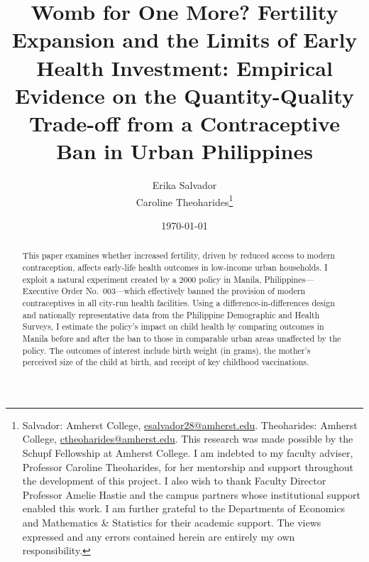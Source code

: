 \documentclass[]{AEA}
\begin{document}
\title{Womb for One More? Fertility Expansion and the Limits of Early
Health Investment: Empirical Evidence on the Quantity-Quality Trade-off
from a Contraceptive Ban in Urban Philippines}


\author{
  Erika Salvador\\
  Caroline Theoharides\thanks{
  Salvador: Amherst
College, \href{mailto:esalvador28@amherst.edu}{esalvador28@amherst.edu}.
  Theoharides: Amherst
College, \href{mailto:ctheoharides@amherst.edu}{ctheoharides@amherst.edu}.
  This research was made possible by the Schupf Fellowship at Amherst
  College. I am indebted to my faculty adviser, Professor Caroline
  Theoharides, for her mentorship and support throughout the development
  of this project. I also wish to thank Faculty Director Professor
  Amelie Hastie and the campus partners whose institutional support
  enabled this work. I am further grateful to the Departments of
  Economics and Mathematics \& Statistics for their academic support.
  The views expressed and any errors contained herein are entirely my
  own responsibility.
}
}

\date{\today}
\pubVolume{}
\pubIssue{}

\begin{abstract}
This paper examines whether increased fertility, driven by reduced
access to modern contraception, affects early-life health outcomes in
low-income urban households. I exploit a natural experiment created by a
2000 policy in Manila, Philippines---Executive Order No.~003---which
effectively banned the provision of modern contraceptives in all
city-run health facilities. Using a difference-in-differences design and
nationally representative data from the Philippine Demographic and
Health Surveys, I estimate the policy's impact on child health by
comparing outcomes in Manila before and after the ban to those in
comparable urban areas unaffected by the policy. The outcomes of
interest include birth weight (in grams), the mother's perceived size of
the child at birth, and receipt of key childhood vaccinations.
\end{abstract}


\maketitle
\end{document}
